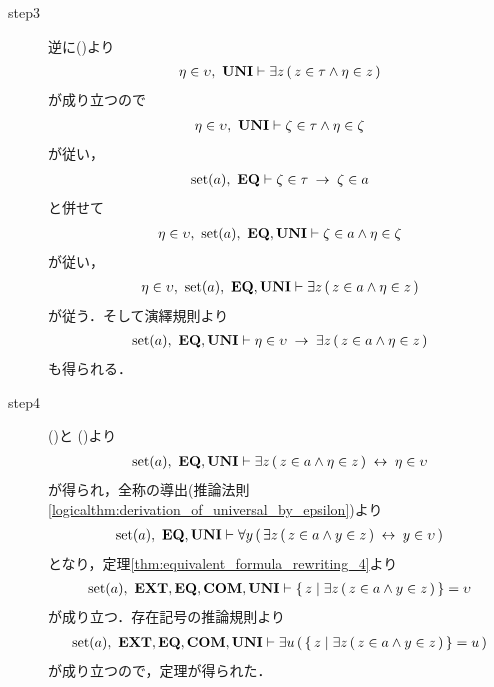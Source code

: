 \begin{sketch}
\begin{description}
			\item[step3]
				逆に()より
				\begin{align}
					\eta \in \upsilon,\ \mbox{{\bf UNI}} \vdash
					\exists z\, (\, z \in \tau \wedge \eta \in z\, )
				\end{align}
				が成り立つので
				\begin{align}
					\eta \in \upsilon,\ \mbox{{\bf UNI}} \vdash
					\zeta \in \tau \wedge \eta \in \zeta
				\end{align}
				が従い，
				\begin{align}
					\operatorname*{set} (a),\ \mbox{{\bf EQ}} \vdash
					\zeta \in \tau \hspace{0.25em}\rightarrow\hspace{0.25em} \zeta \in a
				\end{align}
				と併せて
				\begin{align}
					\eta \in \upsilon,\ \operatorname*{set} (a),\ \mbox{{\bf EQ}},\mbox{{\bf UNI}} \vdash
					\zeta \in a \wedge \eta \in \zeta
				\end{align}
				が従い，
				\begin{align}
					\eta \in \upsilon,\ \operatorname*{set} (a),\ \mbox{{\bf EQ}},\mbox{{\bf UNI}} \vdash
					\exists z\, (\, z \in a \wedge \eta \in z\, )
				\end{align}
				が従う．そして演繹規則より
				\begin{align}
					\operatorname*{set} (a),\ \mbox{{\bf EQ}},\mbox{{\bf UNI}} \vdash
					\eta \in \upsilon \hspace{0.25em}\rightarrow\hspace{0.25em} \exists z\, (\, z \in a \wedge \eta \in z\, )
					\label{fom:union_of_a_set_is_a_set_3}
				\end{align}
				も得られる．
				
			\item[step4]
				()と
				()より
				\begin{align}
					\operatorname*{set} (a),\ \mbox{{\bf EQ}},\mbox{{\bf UNI}} \vdash
					\exists z\, (\, z \in a \wedge \eta \in z\, ) \hspace{0.25em}\leftrightarrow\hspace{0.25em} \eta \in \upsilon
				\end{align}
				が得られ，全称の導出(推論法則\ref{logicalthm:derivation_of_universal_by_epsilon})より
				\begin{align}
					\operatorname*{set} (a),\ \mbox{{\bf EQ}},\mbox{{\bf UNI}} \vdash
					\forall y\, (\, \exists z\, (\, z \in a \wedge y \in z\, ) \hspace{0.25em}\leftrightarrow\hspace{0.25em} y \in \upsilon\, )
				\end{align}
				となり，定理\ref{thm:equivalent_formula_rewriting_4}より
				\begin{align}
					\operatorname*{set} (a),\ \mbox{{\bf EXT}},\mbox{{\bf EQ}},\mbox{\bf COM},\mbox{{\bf UNI}} \vdash
					\left\{\, z \mid \exists z\, (\, z \in a \wedge y \in z\, )\, \right\} = \upsilon
				\end{align}
				が成り立つ．存在記号の推論規則より
				\begin{align}
					\operatorname*{set} (a),\ \mbox{{\bf EXT}},\mbox{{\bf EQ}},\mbox{\bf COM},\mbox{{\bf UNI}} \vdash
					\exists u\, (\, \left\{\, z \mid \exists z\, (\, z \in a \wedge y \in z\, )\, \right\} = u\, )
				\end{align}
				が成り立つので，定理が得られた．
				\QED
		\end{description}
	\end{sketch}
	
